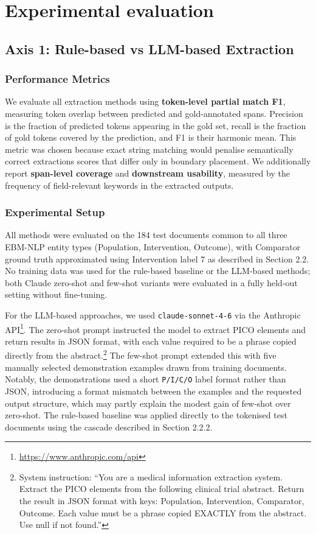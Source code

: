 \documentclass{article}
\begin{document}
\section{Experimental evaluation}
\label{headings}

\subsection{Axis 1: Rule-based vs LLM-based Extraction}

\subsubsection{Performance Metrics}

We evaluate all extraction methods using \textbf{token-level partial match F1}, measuring token overlap between predicted and gold-annotated spans. Precision is the fraction of predicted tokens appearing in the gold set, recall is the fraction of gold tokens covered by the prediction, and F1 is their harmonic mean. This metric was chosen because exact string matching would penalise semantically correct extractions scores that differ only in boundary placement. We additionally report \textbf{span-level coverage} and \textbf{downstream usability}, measured by the frequency of field-relevant keywords in the extracted outputs.

\subsubsection{Experimental Setup}

All methods were evaluated on the 184 test documents common to all three EBM-NLP entity types (Population, Intervention, Outcome), with Comparator ground truth approximated using Intervention label 7 as described in Section 2.2. No training data was used for the rule-based baseline or the LLM-based methods; both Claude zero-shot and few-shot variants were evaluated in a fully held-out setting without fine-tuning.

For the LLM-based approaches, we used \texttt{claude-sonnet-4-6} via the Anthropic API\footnote{\url{https://www.anthropic.com/api}}. The zero-shot prompt instructed the model to extract PICO elements and return results in JSON format, with each value required to be a phrase copied directly from the abstract.\footnote{System instruction: ``You are a medical information extraction system. Extract the PICO elements from the following clinical trial abstract. Return the result in JSON format with keys: Population, Intervention, Comparator, Outcome. Each value must be a phrase copied EXACTLY from the abstract. Use null if not found.''} The few-shot prompt extended this with five manually selected demonstration examples drawn from training documents. Notably, the demonstrations used a short \texttt{P/I/C/O} label format rather than JSON, introducing a format mismatch between the examples and the requested output structure, which may partly explain the modest gain of few-shot over zero-shot. The rule-based baseline was applied directly to the tokenised test documents using the cascade described in Section 2.2.2.
\end{document}
